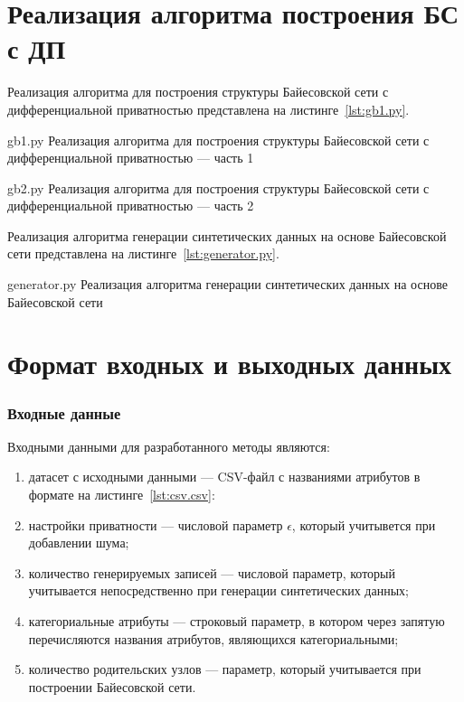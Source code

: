 \section{Реализация алгоритма построения БС с ДП}


Реализация алгоритма для построения структуры Байесовской сети с дифференциальной приватностью представлена на листинге~\ref{lst:gb1.py}.

{gb1.py} %
{Реализация алгоритма для построения структуры Байесовской сети с дифференциальной приватностью --- часть 1} %

{gb2.py} %
{Реализация алгоритма для построения структуры Байесовской сети с дифференциальной приватностью --- часть 2} %

Реализация алгоритма генерации синтетических данных на основе Байесовской сети представлена на листинге~\ref{lst:generator.py}.

{generator.py} %
{Реализация алгоритма генерации синтетических данных на основе Байесовской сети} %

\section{Формат входных и выходных данных}
\subsubsection{Входные данные}
Входными данными для разработанного методы являются:
\begin{enumerate}
	\item датасет с исходными данными --- CSV-файл с названиями атрибутов в формате на листинге~\ref{lst:csv.csv}:
	\item настройки приватности --- числовой параметр $\epsilon$, который учитывется при добавлении шума;
	\item количество генерируемых записей --- числовой параметр, который учитывается непосредственно при генерации синтетических данных;
	\item категориальные атрибуты --- строковый параметр, в котором через запятую перечисляются названия атрибутов, являющихся категориальными;
	\item количество родительских узлов --- параметр, который учитывается при построении Байесовской сети.
\end{enumerate}

